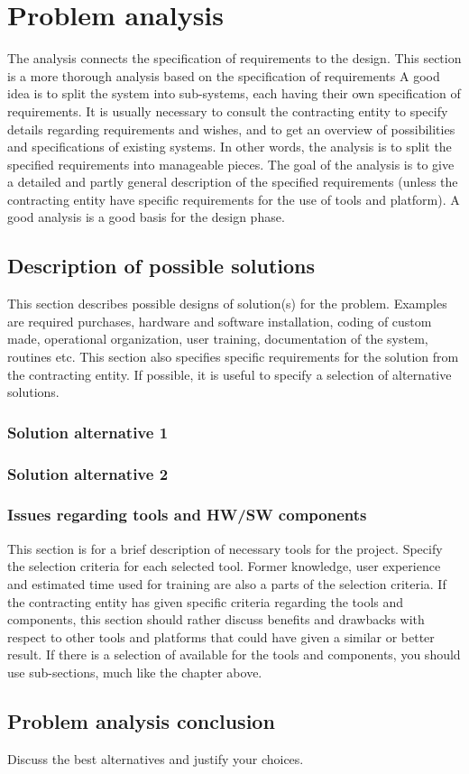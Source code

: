 \section{Problem analysis}
The analysis connects the specification of requirements to the design. This section is a more thorough analysis based on the specification of requirements A good idea is to split the system into sub-systems, each having their own specification of requirements. It is usually necessary to consult the contracting entity to specify details regarding requirements and wishes, and to get an overview of possibilities and specifications of existing systems. In other words, the analysis is to split the specified requirements into manageable pieces. The goal of the analysis is to give a detailed and partly general description of the specified requirements (unless the contracting entity have specific requirements for the use of tools and platform). A good analysis is a good basis for the design phase.

\subsection{Description of possible solutions}
This section describes possible designs of solution(s) for the problem. Examples are required purchases, hardware and software installation, coding of custom made, operational organization, user training, documentation of the system, routines etc. This section also specifies specific requirements for the solution from the contracting entity. If possible, it is useful to specify a selection of alternative solutions.

\subsubsection{Solution alternative 1}

\subsubsection{Solution alternative 2}

\subsubsection{Issues regarding tools and HW/SW components}
This section is for a brief description of necessary tools for the project. Specify the selection criteria for each selected tool. Former knowledge, user experience and estimated time used for training are also a parts of the selection criteria.
If the contracting entity has given specific criteria regarding the tools and components, this section should rather discuss benefits and drawbacks with respect to other tools and platforms that could have given a similar or better result.
If there is a selection of available for the tools and components, you should use sub-sections, much like the chapter above.

\subsection{Problem analysis conclusion}
Discuss the best alternatives and justify your choices.
\pagebreak